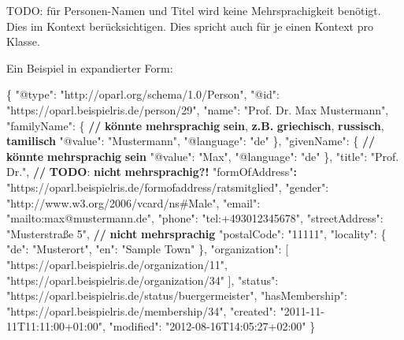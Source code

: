 \documentclass[,a4paper]{article}
\newenvironment{Shaded}{}{}
\newcommand{\DataTypeTok}[1]{\textcolor[rgb]{0.56,0.13,0.00}{{#1}}}
\newcommand{\StringTok}[1]{\textcolor[rgb]{0.25,0.44,0.63}{{#1}}}
\newcommand{\OtherTok}[1]{\textcolor[rgb]{0.00,0.44,0.13}{{#1}}}
\newcommand{\FunctionTok}[1]{\textcolor[rgb]{0.02,0.16,0.49}{{#1}}}
\newcommand{\ErrorTok}[1]{\textcolor[rgb]{1.00,0.00,0.00}{\textbf{{#1}}}}
\begin{document}
TODO: für Personen-Namen und Titel wird keine Mehrsprachigkeit benötigt.
Dies im Kontext berücksichtigen. Dies spricht auch für je einen Kontext
pro Klasse.

Ein Beispiel in expandierter Form:

\begin{Shaded}
\begin{Highlighting}[]
\FunctionTok{\{}
    \DataTypeTok{"@type"}\FunctionTok{:} \StringTok{"http://oparl.org/schema/1.0/Person"}\FunctionTok{,}
    \DataTypeTok{"@id"}\FunctionTok{:} \StringTok{"https://oparl.beispielris.de/person/29"}\FunctionTok{,}
    \DataTypeTok{"name"}\FunctionTok{:} \StringTok{"Prof. Dr. Max Mustermann"}\FunctionTok{,}
    \DataTypeTok{"familyName"}\FunctionTok{:} \FunctionTok{\{} \ErrorTok{//} \ErrorTok{könnte} \ErrorTok{mehrsprachig} \ErrorTok{sein}\FunctionTok{,} \ErrorTok{z.B.} \ErrorTok{griechisch}\FunctionTok{,} \ErrorTok{russisch}\FunctionTok{,} \ErrorTok{tamilisch} 
        \DataTypeTok{"@value"}\FunctionTok{:} \StringTok{"Mustermann"}\FunctionTok{,}
        \DataTypeTok{"@language"}\FunctionTok{:} \StringTok{"de"}
    \FunctionTok{\},}
    \DataTypeTok{"givenName"}\FunctionTok{:} \FunctionTok{\{} \ErrorTok{//} \ErrorTok{könnte} \ErrorTok{mehrsprachig} \ErrorTok{sein}
        \DataTypeTok{"@value"}\FunctionTok{:} \StringTok{"Max"}\FunctionTok{,}
        \DataTypeTok{"@language"}\FunctionTok{:} \StringTok{"de"}
    \FunctionTok{\},}
    \DataTypeTok{"title"}\FunctionTok{:} \StringTok{"Prof. Dr."}\FunctionTok{,} \ErrorTok{//} \ErrorTok{TODO}\FunctionTok{:} \ErrorTok{nicht} \ErrorTok{mehrsprachig?!}
    \StringTok{"formOfAddress"}\ErrorTok{:} \StringTok{"https://oparl.beispielris.de/formofaddress/ratsmitglied"}\FunctionTok{,}
    \DataTypeTok{"gender"}\FunctionTok{:} \StringTok{"http://www.w3.org/2006/vcard/ns#Male"}\FunctionTok{,}
    \DataTypeTok{"email"}\FunctionTok{:} \StringTok{"mailto:max@mustermann.de"}\FunctionTok{,}
    \DataTypeTok{"phone"}\FunctionTok{:} \StringTok{"tel:+493012345678"}\FunctionTok{,}
    \DataTypeTok{"streetAddress"}\FunctionTok{:} \StringTok{"Musterstraße 5"}\FunctionTok{,} \ErrorTok{//} \ErrorTok{nicht} \ErrorTok{mehrsprachig}
    \DataTypeTok{"postalCode"}\FunctionTok{:} \StringTok{"11111"}\FunctionTok{,}
    \DataTypeTok{"locality"}\FunctionTok{:} \FunctionTok{\{}
        \DataTypeTok{"de"}\FunctionTok{:} \StringTok{"Musterort"}\FunctionTok{,}
        \DataTypeTok{"en"}\FunctionTok{:} \StringTok{"Sample Town"}
    \FunctionTok{\},}
    \DataTypeTok{"organization"}\FunctionTok{:} \OtherTok{[}
        \StringTok{"https://oparl.beispielris.de/organization/11"}\OtherTok{,}
        \StringTok{"https://oparl.beispielris.de/organization/34"}
    \OtherTok{]}\FunctionTok{,}
    \DataTypeTok{"status"}\FunctionTok{:} \StringTok{"https://oparl.beispielris.de/status/buergermeister"}\FunctionTok{,}
    \DataTypeTok{"hasMembership"}\FunctionTok{:} \StringTok{"https://oparl.beispielris.de/membership/34"}\FunctionTok{,}
    \DataTypeTok{"created"}\FunctionTok{:} \StringTok{"2011-11-11T11:11:00+01:00"}\FunctionTok{,}
    \DataTypeTok{"modified"}\FunctionTok{:} \StringTok{"2012-08-16T14:05:27+02:00"}
\FunctionTok{\}}
\end{Highlighting}
\end{Shaded}
\end{document}
